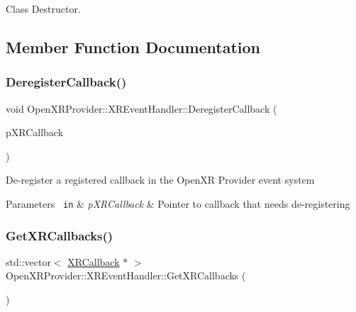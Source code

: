 Class Destructor. 



\subsection{Member Function Documentation}
\mbox{\label{class_open_x_r_provider_1_1_x_r_event_handler_ae64f5c0e0ab34c71a3ab3e9e3d3a3323}} 
\subsubsection{\texorpdfstring{DeregisterCallback()}{DeregisterCallback()}}
{\footnotesize\ttfamily void Open\+X\+R\+Provider\+::\+X\+R\+Event\+Handler\+::\+Deregister\+Callback (\begin{DoxyParamCaption}\item[{\mbox{\hyperlink{struct_open_x_r_provider_1_1_x_r_callback}{X\+R\+Callback}} $\ast$}]{p\+X\+R\+Callback }\end{DoxyParamCaption})\hspace{0.3cm}{\ttfamily [inline]}}

De-\/register a registered callback in the Open\+XR Provider event system 
\begin{DoxyParams}[1]{Parameters}
\mbox{\texttt{ in}}  & {\em p\+X\+R\+Callback} & Pointer to callback that needs de-\/registering \\
\hline
\end{DoxyParams}
\mbox{\label{class_open_x_r_provider_1_1_x_r_event_handler_a6e6ce6065716adc4fcd6cba723fe1b0b}} 
\subsubsection{\texorpdfstring{GetXRCallbacks()}{GetXRCallbacks()}}
{\footnotesize\ttfamily std\+::vector$<$ \mbox{\hyperlink{struct_open_x_r_provider_1_1_x_r_callback}{X\+R\+Callback}} $\ast$ $>$ Open\+X\+R\+Provider\+::\+X\+R\+Event\+Handler\+::\+Get\+X\+R\+Callbacks (\begin{DoxyParamCaption}{ }\end{DoxyParamCaption})\hspace{0.3cm}{\ttfamily [inline]}}

